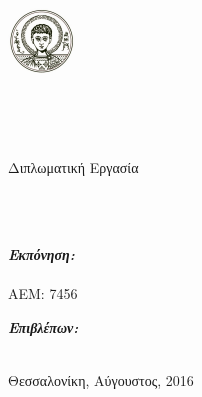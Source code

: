 \documentclass[
11pt, %
oneside, %
english, %
singlespacing, %
headsepline, %
]{MastersDoctoralThesis} %
\author{Κούρος Γεώργιος}
\begin{document}
\frontmatter %
\pagestyle{plain}


\begin{titlepage}
\begin{center}

\includegraphics{images/auth_logo.png}\\[0.2cm]
{\Large \univname}\\ [0.2cm]
{\Large \facname}\\ [0.2cm]
\deptname\\
\groupname\\[3cm]


{\LARGE Διπλωματική Εργασία}\\[1cm] %

\HRule \\[0.4cm] %
{\huge \bfseries \ttitle\par}\vspace{0.4cm} %
\HRule \\[3cm] %

\begin{minipage}[t]{0.4\textwidth}
\begin{flushleft} \large
\emph{\textbf{Εκπόνηση:}}\\ 
\authorname\\
ΑΕΜ: 7456
\end{flushleft}
\end{minipage}
\begin{minipage}[t]{0.4\textwidth}
\begin{flushright} \large
\emph{\textbf{Επιβλέπων:}} \\
\supname %
\end{flushright}
\end{minipage}\\[3cm]


\vfill
{\large Θεσσαλονίκη, Αύγουστος, 2016} %
\end{center}
\end{titlepage}
\end{document}
